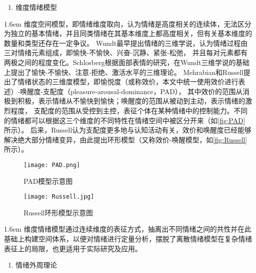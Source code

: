 \begin{enumerate}[\qquad(2)]
    \item 维度情绪模型
\end{enumerate}

\hangindent 1.6em
维度空间模型，即情绪维度取向，认为情绪是高度相关的连续体，无法区分为独立的基本情绪，并且同类情绪在其基本维度上都高度相关，但有关基本维度的数量和类型还存在一定争议。
Wundt\cite{Wundt1896}最早提出情绪的三维学说，认为情绪过程由三对情绪元素组成，即愉快-不愉快、兴奋-沉静、紧张-松弛，
并且每对元素都有两极之间的程度变化。Schlosberg\cite{Schlosberg1954}根据面部表情的研究，在Wundt三维学说的基础上提出了愉快-不愉快、注意-拒绝、激活水平的三维理论。
Mehrabian和Russell\cite{Mehrabian1974}提出了情绪状态的三维度模型，即愉悦度（或称效价，本文中统一使用效价进行表述）-唤醒度-支配度（pleasure-arousal-dominance，PAD），
其中效价的范围从消极到积极，表示情绪从不愉快到愉快；唤醒度的范围从被动到主动，表示情绪的激烈程度，
支配度的范围从受控到主控，表征个体在某种情绪中的控制能力。不同的情绪都可以根据这三个维度的不同特性在情绪空间中被区分开来（如\autoref{fig:PAD}所示）。
后来，Russell\cite{Russell1980}认为支配度更多地与认知活动有关，效价和唤醒度已经能够解决绝大部分情绪变异，由此提出环形模型（又称效价-唤醒模型，如\autoref{fig:Russell}所示）。

\begin{figure}[htbp]
    \hspace {0.1cm}
	\centering
	\begin{minipage}[l]{0.44\textwidth}
		\hspace {-1cm}
        \centering
		\texttt{[image: PAD.png]}
		\caption{PAD模型示意图}
		\label{fig:PAD}
	\end{minipage} 
	\begin{minipage}[c]{0.53\textwidth}
		\hspace {-2cm}
        \centering
		\texttt{[image: Russell.jpg]}
		\hspace {-2cm}
        \setlength{\abovecaptionskip}{-0.01cm}
        \caption{Russell环形模型示意图}
		\label{fig:Russell}
	\end{minipage}
\end{figure}

\hangindent 1.6em
维度情绪模型通过连续维度的表征方式，抽离出不同情绪之间的共性并在此基础上构建空间体系，以便对情绪进行定量分析，摆脱了离散情绪模型在复杂情绪表征上的局限，也更适用于实际研究及应用。

\begin{enumerate}[\hspace{1.2em}2.]    
    \item 情绪外周理论
\end{enumerate}


